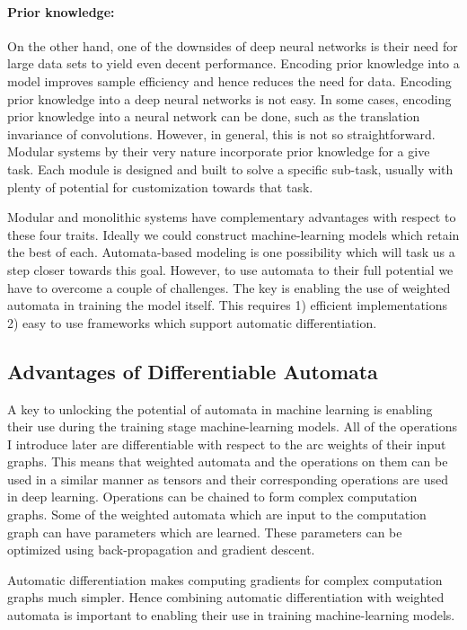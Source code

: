 \documentclass[main.tex]{subfiles}
\begin{document}
\paragraph{Prior knowledge:} On the other hand, one of the downsides of deep
neural networks is their need for large data sets to yield even decent
performance. Encoding prior knowledge into a model improves sample efficiency
and hence reduces the need for data. Encoding prior knowledge into a deep
neural networks is not easy. In some cases, encoding prior knowledge into a
neural network can be done, such as the translation invariance of convolutions.
However, in general, this is not so straightforward. Modular systems by their
very nature incorporate prior knowledge for a give task. Each module is
designed and built to solve a specific sub-task, usually with plenty of
potential for customization towards that task.

Modular and monolithic systems have complementary advantages with respect to
these four traits. Ideally we could construct machine-learning models which
retain the best of each. Automata-based modeling is one possibility which will
task us a step closer towards this goal.  However, to use automata to their
full potential we have to overcome a couple of challenges. The key is enabling
the use of weighted automata in training the model itself. This requires 1)
efficient implementations 2) easy to use frameworks which support automatic
differentiation.

\subsection{Advantages of Differentiable Automata}
\label{sec:advantages}

A key to unlocking the potential of automata in machine learning is enabling
their use during the training stage machine-learning models. All of the
operations I introduce later are differentiable with respect to the arc weights
of their input graphs. This means that weighted automata and the operations on
them can be used in a similar manner as tensors and their corresponding
operations are used in deep learning. Operations can be chained to form complex
computation graphs. Some of the weighted automata which are input to the
computation graph can have parameters which are learned. These parameters can
be optimized using back-propagation and gradient descent.

Automatic differentiation makes computing gradients for complex computation
graphs much simpler. Hence combining automatic differentiation with weighted
automata is important to enabling their use in training machine-learning
models.
\end{document}
